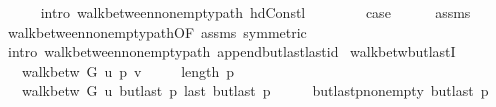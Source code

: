 \begin{isabellebody}
\ \ \ \ \isamarkupfalse%
\ {\isacharparenleft}{\kern0pt}intro\ walk{\isacharunderscore}{\kern0pt}between{\isacharunderscore}{\kern0pt}nonempty{\isacharunderscore}{\kern0pt}path{\isacharparenleft}{\kern0pt}{}{\isacharparenright}{\kern0pt}\ hd{\isacharunderscore}{\kern0pt}Cons{\isacharunderscore}{\kern0pt}tl{\isacharparenright}{\kern0pt}\isanewline
{}\isamarkupfalse%
\isanewline
\ \ \isamarkupfalse%
\ {}\isanewline
\ \ \isamarkupfalse%
\ {\isacharquery}{\kern0pt}case\isanewline
\ \ \ \ \isamarkupfalse%
\ assms\isanewline
\ \ \ \ \isamarkupfalse%
\ walk{\isacharunderscore}{\kern0pt}between{\isacharunderscore}{\kern0pt}nonempty{\isacharunderscore}{\kern0pt}path{\isacharparenleft}{\kern0pt}{}{\isacharparenright}{\kern0pt}{\isacharbrackleft}{\kern0pt}OF\ assms{\isacharcomma}{\kern0pt}\ symmetric{\isacharbrackright}{\kern0pt}\isanewline
\ \ \ \ \isamarkupfalse%
\ {\isacharparenleft}{\kern0pt}intro\ walk{\isacharunderscore}{\kern0pt}between{\isacharunderscore}{\kern0pt}nonempty{\isacharunderscore}{\kern0pt}path{\isacharparenleft}{\kern0pt}{}{\isacharparenright}{\kern0pt}\ append{\isacharunderscore}{\kern0pt}butlast{\isacharunderscore}{\kern0pt}last{\isacharunderscore}{\kern0pt}id{\isacharparenright}{\kern0pt}\isanewline
{}\isamarkupfalse%
%
\endisatagproof
{\isafoldproof}%
%
\isadelimproof
\isanewline
%
\endisadelimproof
%
\isadeliminvisible
\isanewline
%
\endisadeliminvisible
%
\isataginvisible
{}\isamarkupfalse%
\ walk{\isacharunderscore}{\kern0pt}betw{\isacharunderscore}{\kern0pt}butlastI{\isacharcolon}{\kern0pt}\isanewline
\ \ \ {\isachardoublequoteopen}walk{\isacharunderscore}{\kern0pt}betw\ G\ u\ p\ v{\isachardoublequoteclose}\isanewline
\ \ \ {\isachardoublequoteopen}{}\ {\isasymle}\ length\ p{\isachardoublequoteclose}\isanewline
\ \ \ {\isachardoublequoteopen}walk{\isacharunderscore}{\kern0pt}betw\ G\ u\ {\isacharparenleft}{\kern0pt}butlast\ p{\isacharparenright}{\kern0pt}\ {\isacharparenleft}{\kern0pt}last\ {\isacharparenleft}{\kern0pt}butlast\ p{\isacharparenright}{\kern0pt}{\isacharparenright}{\kern0pt}{\isachardoublequoteclose}%
\endisataginvisible
{\isafoldinvisible}%
%
\isadeliminvisible
\isanewline
%
\endisadeliminvisible
%
\isadelimproof
%
\endisadelimproof
%
\isatagproof
{}\isamarkupfalse%
\ {\isacharminus}{\kern0pt}\isanewline
\ \ \isamarkupfalse%
\ butlast{\isacharunderscore}{\kern0pt}p{\isacharunderscore}{\kern0pt}non{\isacharunderscore}{\kern0pt}empty{\isacharcolon}{\kern0pt}\ {\isachardoublequoteopen}butlast\ p\ {\isasymnoteq}\ {\isacharbrackleft}{\kern0pt}{\isacharbrackright}{\kern0pt}{\isachardoublequoteclose}\isanewline

\end{isabellebody}
